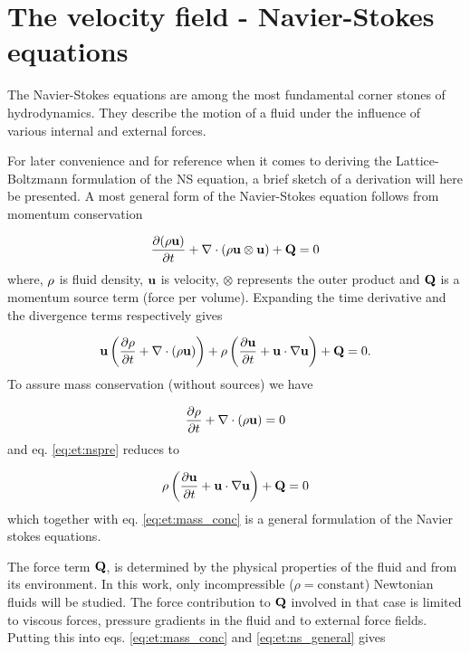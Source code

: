 \section{The velocity field - Navier-Stokes equations}\label{sec:et:ns}
The Navier-Stokes equations are among the most fundamental corner
stones of hydrodynamics. They describe the motion of a fluid under
the influence of various internal and external forces.

For later convenience and for reference when it comes to deriving the
Lattice-Boltzmann formulation of the NS equation, a brief sketch of a
derivation will here be presented. A most general form of the
Navier-Stokes equation follows from momentum conservation

\begin{equation}
\dfrac{\partial (\mathrm{\rho} \mathbf{u})}{\partial t} + \nabla \cdot (\rho \mathbf{u}
\otimes \mathbf{u}) + \mathbf{Q} = 0 
\end{equation}
where, $\mathrm{\rho}$ is fluid density, $\mathbf{u}$ is velocity, $\otimes$
represents the outer product and $\mathbf{Q}$ is a momentum source term
(force per volume). Expanding the time derivative and the divergence
terms respectively gives
 
\begin{equation}\label{eq:et:nspre}
\mathbf{u} \left ( \dfrac{\partial \mathrm{\rho}}{\partial t} + \nabla \cdot
  (\mathrm{\rho} \mathbf{u}) \right ) + \mathrm{\rho} \left (\dfrac{\partial \mathbf{u}}{\partial t} +
  \mathbf{u} \cdot \nabla \mathbf{u} 
  \right ) + \mathbf{Q} = 0.
\end{equation}
To assure mass conservation (without sources) we have

\begin{equation}\label{eq:et:mass_conc}
 \dfrac{\partial \mathrm{\rho}}{\partial t} + \nabla \cdot(
  \mathrm{\rho} \mathbf{u}) = 0
\end{equation}
and eq. \eqref{eq:et:nspre} reduces to

\begin{equation}\label{eq:et:ns_general} 
\mathrm{\rho} \left (\dfrac{\partial \mathbf{u}}{\partial t} +
  \mathbf{u} \cdot \nabla \mathbf{u} 
  \right ) + \mathbf{Q} = 0
\end{equation}
which together with eq. \eqref{eq:et:mass_conc} is a general
formulation of the Navier stokes equations. 

The force term $\mathbf{Q}$, is determined by the physical properties of the
fluid and from its environment. In this work, only incompressible
($\rho = \mbox{constant}$) Newtonian fluids will be studied. The force
contribution to $\mathbf{Q}$ involved in that case is limited to viscous
forces, pressure gradients in the fluid and to external force
fields. Putting this into eqs. \eqref{eq:et:mass_conc} and
\eqref{eq:et:ns_general} gives


